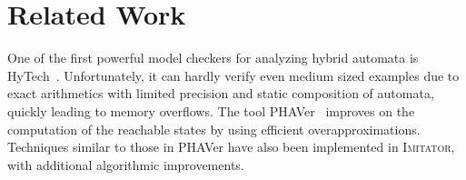 \documentclass{llncs}
\newcommand{\hytech}{{\sc HyTech}}
\newcommand{\imitator}{\textsc{Imitator}}
\newcommand{\phaver}{PHAVer}
\newcommand{\commentaire}[1]{}
\begin{document}

\commentaire{experiences ?}

\commentaire{rapport d'etudes de cas a rediger}



\section{Related Work}


One of the first powerful model checkers for analyzing hybrid automata is \hytech{}~\cite{hhw97}.
Unfortunately, it can hardly verify even medium sized examples due to exact arithmetics with limited precision and static composition of automata, quickly leading to memory overflows. The tool \phaver{}~\cite{frehse05} improves on the computation of the reachable states by using efficient overapproximations. Techniques similar to those in \phaver{} have also been implemented in \imitator{}, with additional algorithmic improvements.




% 
% 
% 
% 
% 
% 
% 
% 
% 
\end{document}
